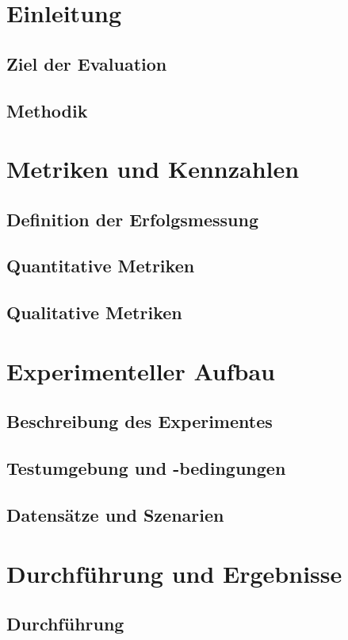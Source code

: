 \documentclass[a4paper,10pt,twoside]{report}
\begin{document}
\section{Einleitung}
\subsection{Ziel der Evaluation}
\subsection{Methodik}

\section{Metriken und Kennzahlen}
\subsection{Definition der Erfolgsmessung}
\subsection{Quantitative Metriken}
\subsection{Qualitative Metriken}

\section{Experimenteller Aufbau}
\subsection{Beschreibung des Experimentes}
\subsection{Testumgebung und -bedingungen}
\subsection{Datensätze und Szenarien}

\section{Durchführung und Ergebnisse}
\subsection{Durchführung}
\end{document}
